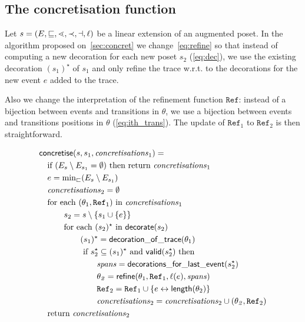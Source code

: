 \subsection{The concretisation function}
\label{sec:app_concret}

Let $s = (E,\sqsubseteq,\lessdot,\prec,\dashv,\ell)$ be a linear extension of an augmented poset.
In the algorithm proposed on~\autoref{sec:concret} we change~\autoref{eq:refine} so that instead of computing a new decoration for each new poset $s_2$ (\autoref{eq:dec}), we use the existing decoration $(s_1)^{\star}$ of $s_1$ and only refine the trace w.r.t. to the decorations for the new event $e$ added to the trace.

Also we change the interpretation of the refinement function $\mathtt{Ref}$: instead of a bijection between events and transitions in $\theta$, we use a bijection between events and transitions positions in $\theta$ (\autoref{eq:ith_trans}). The update of $\mathtt{Ref}_1$ to $\mathtt{Ref}_2$ is then straightforward.

\begin{align}
  &\mathsf{concretise}(s,s_1,\mathit{concretisations}_1) = \\
  &\quad\text{if }(E_s\setminus E_{s_1} = \emptyset)\text{ then return }\mathit{concretisations}_1\\
  &\quad e = \text{min}_{\sqsubset}(E_s\setminus E_{s_1})\\
  &\quad\mathit{concretisations}_2 = \emptyset \\
  &\quad\text{for each }(\theta_1,\mathtt{Ref}_1)\text{ in }\mathit{concretisations}_1\\
  &\quad\qquad s_2 = s\setminus\{s_1\cup\{e\}\}\\
  \label{eq:dec}
  &\quad\qquad\text{for each }(s_2)^{\star}\text{ in }\mathsf{decorate}(s_2)\\
  &\quad\qquad\qquad (s_1)^{\star} = \mathsf{decoration\_of\_trace}(\theta_1)\\
  &\quad\qquad\qquad \text{ if }s_2^{\star}\subseteq (s_1)^{\star}\text{ and }\mathsf{valid}(s_2^{\star})\text{ then }\\
  &\quad\qquad\qquad\qquad \mathit{spans} = \mathsf{decorations\_for\_last\_event}(s_2^{\star})\\
  \label{eq:refine}
  &\quad\qquad\qquad\qquad \mathit{\theta_2} = \mathsf{refine}(\theta_1,\mathtt{Ref}_1,\ell(e),\mathit{spans})\\
  &\quad\qquad\qquad\qquad \mathtt{Ref}_2 = \mathtt{Ref}_1\cup\{e\leftrightarrow\mathsf{length}(\theta_2)\}\\
  &\quad\qquad\qquad\qquad \mathit{concretisations}_2 = \mathit{concretisations}_2 \cup (\mathit{\theta_2},\mathtt{Ref}_2)\\
  &\quad\text{return }\mathit{concretisations}_2
\end{align}


